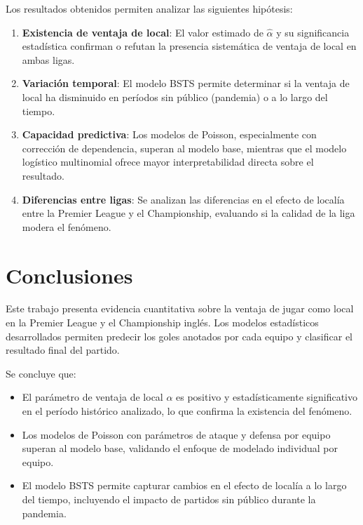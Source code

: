 \documentclass[a4paper,12pt]{article}
\begin{document}
Los resultados obtenidos permiten analizar las siguientes hipótesis:

\begin{enumerate}
    \item \textbf{Existencia de ventaja de local}: El valor estimado de $\hat{\alpha}$ y su significancia estadística confirman o refutan la presencia sistemática de ventaja de local en ambas ligas.
    \item \textbf{Variación temporal}: El modelo BSTS permite determinar si la ventaja de local ha disminuido en períodos sin público (pandemia) o a lo largo del tiempo.
    \item \textbf{Capacidad predictiva}: Los modelos de Poisson, especialmente con corrección de dependencia, superan al modelo base, mientras que el modelo logístico multinomial ofrece mayor interpretabilidad directa sobre el resultado.
    \item \textbf{Diferencias entre ligas}: Se analizan las diferencias en el efecto de localía entre la Premier League y el Championship, evaluando si la calidad de la liga modera el fenómeno.
\end{enumerate}

\section{Conclusiones}

Este trabajo presenta evidencia cuantitativa sobre la ventaja de jugar como local en la Premier League y el Championship inglés. Los modelos estadísticos desarrollados permiten predecir los goles anotados por cada equipo y clasificar el resultado final del partido.

Se concluye que:
\begin{itemize}
    \item El parámetro de ventaja de local $\alpha$ es positivo y estadísticamente significativo en el período histórico analizado, lo que confirma la existencia del fenómeno.
    \item Los modelos de Poisson con parámetros de ataque y defensa por equipo superan al modelo base, validando el enfoque de modelado individual por equipo.
    \item El modelo BSTS permite capturar cambios en el efecto de localía a lo largo del tiempo, incluyendo el impacto de partidos sin público durante la pandemia.
\end{itemize}
\end{document}
